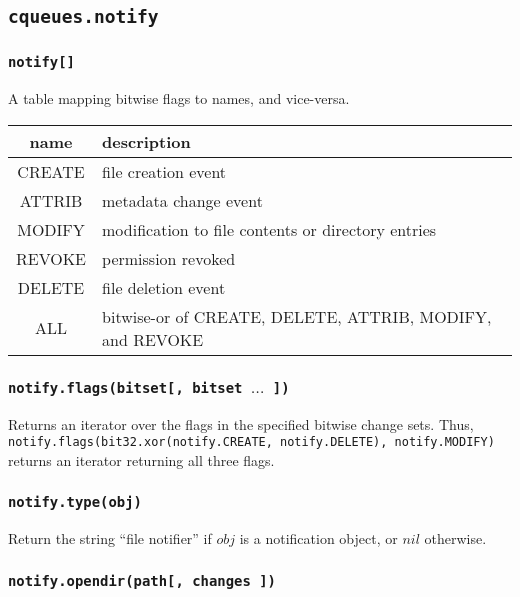 \documentclass[11pt, oneside]{memoir}
\newcommand*{\routine}[1]{\texttt{#1}\xspace}
\newcommand*{\fn}[1]{\texttt{#1}\xspace}
\newcounter{toccols}
\newenvironment{Module}[1]{
	\subsection{\texttt{#1}}
	\addtocontents{toc}{
		\protect\begin{multicols}{\value{toccols}}
	}
}{
	\addtocontents{toc}{\protect\end{multicols}}
}
\begin{document}
\begin{Module}{cqueues.notify}

\subsubsection[\fn{notify[]}]{\fn{notify[]}}
A table mapping bitwise flags to names, and vice-versa.

\begin{tabular}{c | l}

name & description \\\hline
CREATE & file creation event \\
ATTRIB & metadata change event \\
MODIFY & modification to file contents or directory entries \\
REVOKE & permission revoked \\
DELETE & file deletion event \\
ALL    & bitwise-or of CREATE, DELETE, ATTRIB, MODIFY, and REVOKE
\end{tabular}

\subsubsection[\fn{notify.flags}]{\fn{notify.flags(bitset[, bitset $\ldots$ ])}}

Returns an iterator over the flags in the specified bitwise change sets. Thus, \texttt{notify.flags(bit32.xor(notify.CREATE, notify.DELETE), notify.MODIFY)} returns an iterator returning all three flags.

\subsubsection[\routine{notify.type}]{\routine{notify.type(obj)}}
Return the string ``file notifier'' if $obj$ is a notification object, or $nil$ otherwise.

\subsubsection[\fn{notify.opendir}]{\fn{notify.opendir(path[, changes ])}}


\end{Module}
\end{document}
